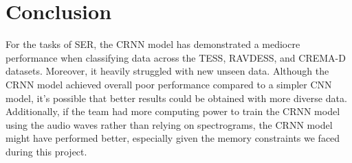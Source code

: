 \documentclass[../main.tex]{subfiles}
\begin{document}
\section{Conclusion}

For the tasks of SER, the CRNN model has demonstrated a mediocre performance when classifying data across the TESS, RAVDESS, and CREMA-D datasets.
Moreover, it heavily struggled with new unseen data. Although the CRNN model achieved overall poor performance compared to a simpler CNN model, it’s
possible that better results could be obtained with more diverse data. Additionally, if the team had more computing power to train the CRNN model using the audio
waves rather than relying on spectrograms, the CRNN model might have performed better, especially given the memory constraints we faced during this project.
\end{document}
